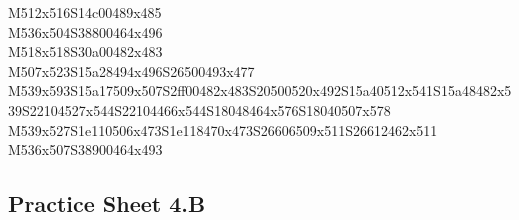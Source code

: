 \documentclass{article}
\begin{document}
\begin{multicols}{5}
\begin{center}
M512x516S14c00489x485 %
\\M536x504S38800464x496 %
\\M518x518S30a00482x483 %
\\M507x523S15a28494x496S26500493x477 %
\\M539x593S15a17509x507S2ff00482x483S20500520x492S15a40512x541S15a48482x539S22104527x544S22104466x544S18048464x576S18040507x578 %
\\M539x527S1e110506x473S1e118470x473S26606509x511S26612462x511 %
\\M536x507S38900464x493 %
\vfil

\end{center}
\end{multicols}

\subsection{Practice Sheet 4.B}
\end{document}
